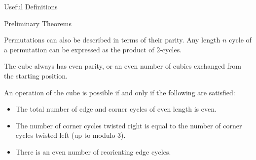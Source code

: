 \documentclass[final]{beamer}
\newlength{\colwidth}
\begin{document}
\begin{frame}[t]
\begin{columns}[t]
\begin{column}{\colwidth}
\begin{alertblock}{Useful Definitions}




  \end{alertblock}
 
  \begin{exampleblock}{Preliminary Theorems}

     Permutations can also be described in terms of their parity. Any length $n$
cycle of a permutation can be expressed as the product of $2$-cycles.

The cube always has even parity, or an even number of cubies
exchanged from the starting position.

      An operation of the cube is possible if and only if the following are satisfied:
            \begin{itemize}
              \item The total number of edge and corner cycles of even length is even.
              \item The number of corner cycles twisted right is equal to the number of corner cycles twisted left (up to modulo $3$).
              \item There is an even number of reorienting edge cycles.



\end{itemize}
\end{exampleblock}
\end{column}
\end{columns}
\end{frame}
\end{document}
